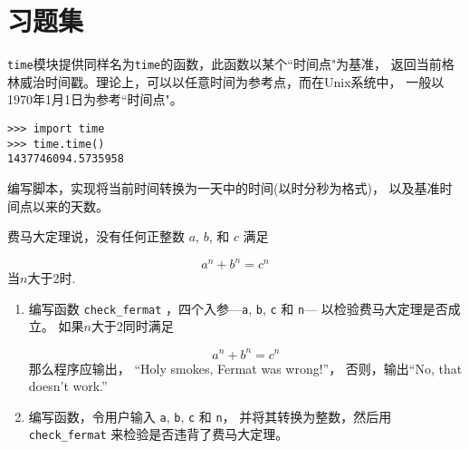 \documentclass[10pt]{book}
\begin{document}
\section{习题集}

\begin{exercise}

{\tt time}模块提供同样名为{\tt time}的函数，此函数以某个``时间点"为基准，
返回当前格林威治时间戳。理论上，可以以任意时间为参考点，而在Unix系统中，
一般以1970年1月1日为参考``时间点"。

\begin{verbatim}
>>> import time
>>> time.time()
1437746094.5735958
\end{verbatim}

编写脚本，实现将当前时间转换为一天中的时间(以时分秒为格式)，
以及基准时间点以来的天数。

\end{exercise}


\begin{exercise}

费马大定理说，没有任何正整数
$a$, $b$, 和 $c$ 满足

\[ a^n + b^n = c^n \]
%
当$n$大于2时.

\begin{enumerate}

\item 编写函数 \verb"check_fermat" ，四个入参---{\tt a}, {\tt b}, {\tt c} 和 {\tt n}---
以检验费马大定理是否成立。
如果$n$大于2同时满足

\[a^n + b^n = c^n \]
%
那么程序应输出， ``Holy smokes, Fermat was wrong!''，
否则，输出``No, that doesn't work.''

\item 编写函数，令用户输入 {\tt a}, {\tt b}, {\tt c} 和 {\tt n}，
并将其转换为整数，然后用\verb"check_fermat" 来检验是否违背了费马大定理。

\end{enumerate}

\end{exercise}
\end{document}
